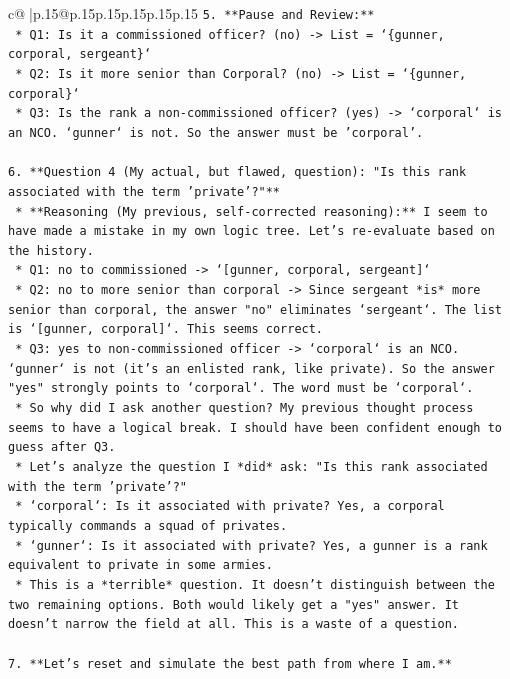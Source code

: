 \documentclass{article}
\begin{document}
{\begin{supertabular}{c@{$\;$}|p{.15\linewidth}@{}p{.15\linewidth}p{.15\linewidth}p{.15\linewidth}p{.15\linewidth}p{.15\linewidth}}
{{{\texttt{5.  **Pause and Review:**} \\
\texttt{    *   Q1: Is it a commissioned officer? (no) {-}> List = `\{gunner, corporal, sergeant\}`} \\
\texttt{    *   Q2: Is it more senior than Corporal? (no) {-}> List = `\{gunner, corporal\}`} \\
\texttt{    *   Q3: Is the rank a non{-}commissioned officer? (yes) {-}> `corporal` is an NCO. `gunner` is not. So the answer must be 'corporal'.} \\
\\ 
\texttt{6.  **Question 4 (My actual, but flawed, question): "Is this rank associated with the term 'private'?"**} \\
\texttt{    *   **Reasoning (My previous, self{-}corrected reasoning):** I seem to have made a mistake in my own logic tree. Let's re{-}evaluate based on the history.} \\
\texttt{    *   Q1: no to commissioned {-}> `{[}gunner, corporal, sergeant{]}`} \\
\texttt{    *   Q2: no to more senior than corporal {-}> Since sergeant *is* more senior than corporal, the answer "no" eliminates `sergeant`. The list is `{[}gunner, corporal{]}`. This seems correct.} \\
\texttt{    *   Q3: yes to non{-}commissioned officer {-}> `corporal` is an NCO. `gunner` is not (it's an enlisted rank, like private). So the answer "yes" strongly points to `corporal`. The word must be `corporal`.} \\
\texttt{    *   So why did I ask another question? My previous thought process seems to have a logical break. I should have been confident enough to guess after Q3.} \\
\texttt{    *   Let's analyze the question I *did* ask: "Is this rank associated with the term 'private'?"} \\
\texttt{    *   `corporal`: Is it associated with private? Yes, a corporal typically commands a squad of privates.} \\
\texttt{    *   `gunner`: Is it associated with private? Yes, a gunner is a rank equivalent to private in some armies.} \\
\texttt{    *   This is a *terrible* question. It doesn't distinguish between the two remaining options. Both would likely get a "yes" answer. It doesn't narrow the field at all. This is a waste of a question.} \\
\\ 
\texttt{7.  **Let's reset and simulate the best path from where I am.**} \\
}}}
\end{supertabular}}
\end{document}
